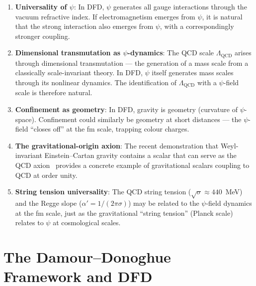 \documentclass[aps,prd,twocolumn,superscriptaddress,floatfix,nofootinbib]{revtex4-2}
\newcommand{\LQCD}{\Lambda_{\mathrm{QCD}}}
\begin{document}
\begin{enumerate}
\item \textbf{Universality of $\psi$}: In DFD, $\psi$ generates all gauge
interactions through the vacuum refractive index. If electromagnetism emerges
from $\psi$, it is natural that the strong interaction also emerges from $\psi$,
with a correspondingly stronger coupling.

\item \textbf{Dimensional transmutation as $\psi$-dynamics}: The QCD scale
$\LQCD$ arises through dimensional transmutation --- the generation of a mass
scale from a classically scale-invariant theory. In DFD, $\psi$ itself
generates mass scales through its nonlinear dynamics. The identification of
$\LQCD$ with a $\psi$-field scale is therefore natural.

\item \textbf{Confinement as geometry}: In DFD, gravity is geometry (curvature
of $\psi$-space). Confinement could similarly be geometry at short distances ---
the $\psi$-field ``closes off'' at the fm scale, trapping colour charges.

\item \textbf{The gravitational-origin axion}: The recent demonstration that
Weyl-invariant Einstein--Cartan gravity contains a scalar that can serve as the
QCD axion~\cite{GravAxion2025} provides a concrete example of gravitational
scalars coupling to QCD at order unity.

\item \textbf{String tension universality}: The QCD string tension ($\sqrt{\sigma}
\approx 440$~MeV) and the Regge slope ($\alpha' = 1/(2\pi\sigma)$) may be
related to the $\psi$-field dynamics at the fm scale, just as the gravitational
``string tension'' (Planck scale) relates to $\psi$ at cosmological scales.
\end{enumerate}


\section{The Damour--Donoghue Framework and DFD}
\label{sec:damour}
\end{document}
